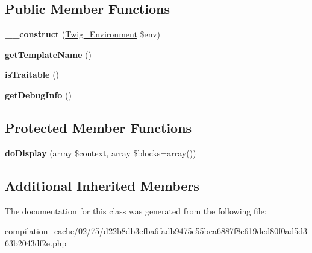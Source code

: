 \subsection*{Public Member Functions}
\begin{DoxyCompactItemize}
\item 
\hypertarget{class_____twig_template__0275d22b8db3efba6fadb9475e55bea6887f8c619dcd80f0ad5d363b2043df2e_a4f8326243132c1450a81e0a817aa1be7}{}{\bfseries \+\_\+\+\_\+construct} (\hyperlink{class_twig___environment}{Twig\+\_\+\+Environment} \$env)\label{class_____twig_template__0275d22b8db3efba6fadb9475e55bea6887f8c619dcd80f0ad5d363b2043df2e_a4f8326243132c1450a81e0a817aa1be7}

\item 
\hypertarget{class_____twig_template__0275d22b8db3efba6fadb9475e55bea6887f8c619dcd80f0ad5d363b2043df2e_a621a3ccd148ed8b9e937da6959c98f39}{}{\bfseries get\+Template\+Name} ()\label{class_____twig_template__0275d22b8db3efba6fadb9475e55bea6887f8c619dcd80f0ad5d363b2043df2e_a621a3ccd148ed8b9e937da6959c98f39}

\item 
\hypertarget{class_____twig_template__0275d22b8db3efba6fadb9475e55bea6887f8c619dcd80f0ad5d363b2043df2e_aa9eb89be270f6afc256ef5e272b78a63}{}{\bfseries is\+Traitable} ()\label{class_____twig_template__0275d22b8db3efba6fadb9475e55bea6887f8c619dcd80f0ad5d363b2043df2e_aa9eb89be270f6afc256ef5e272b78a63}

\item 
\hypertarget{class_____twig_template__0275d22b8db3efba6fadb9475e55bea6887f8c619dcd80f0ad5d363b2043df2e_abd0ecb0136f4228db2bd963bfc1e20d7}{}{\bfseries get\+Debug\+Info} ()\label{class_____twig_template__0275d22b8db3efba6fadb9475e55bea6887f8c619dcd80f0ad5d363b2043df2e_abd0ecb0136f4228db2bd963bfc1e20d7}

\end{DoxyCompactItemize}
\subsection*{Protected Member Functions}
\begin{DoxyCompactItemize}
\item 
\hypertarget{class_____twig_template__0275d22b8db3efba6fadb9475e55bea6887f8c619dcd80f0ad5d363b2043df2e_adb62b7c226e07d30f836ed16158d924f}{}{\bfseries do\+Display} (array \$context, array \$blocks=array())\label{class_____twig_template__0275d22b8db3efba6fadb9475e55bea6887f8c619dcd80f0ad5d363b2043df2e_adb62b7c226e07d30f836ed16158d924f}

\end{DoxyCompactItemize}
\subsection*{Additional Inherited Members}


The documentation for this class was generated from the following file\+:\begin{DoxyCompactItemize}
\item 
compilation\+\_\+cache/02/75/d22b8db3efba6fadb9475e55bea6887f8c619dcd80f0ad5d363b2043df2e.\+php\end{DoxyCompactItemize}
